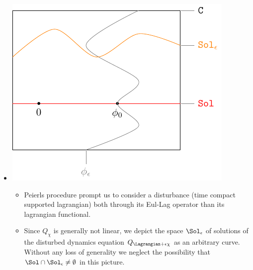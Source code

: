 \documentclass[a4paper,11pt]{scrartcl}
\begin{document}
\begin{itemize}
\item 
        \begin{minipage}{0.4\textwidth}
            \includegraphics[width=\textwidth]{../Pictures/GeometricPicture1}
        \end{minipage}
        \begin{minipage}{0.5\textwidth}
            \begin{itemize}
                \item Peierls procedure prompt us to consider a disturbance (time compact supported lagrangian) both through its Eul-Lag operator than its lagrangian functional.
                \item     Since $Q_\chi$ is generally not linear,
                 we depict the space $\Sol_\epsilon$ of solutions of the disturbed dynamics equation $Q_{\Lagrangian + \epsilon \chi}$ as an arbitrary curve.\\
                    Without any loss of generality we  neglect the possibility that $\Sol \cap \Sol_\epsilon \neq \emptyset$ in this picture.
            \end{itemize}
        \end{minipage}
        

\end{itemize}
\end{document}

